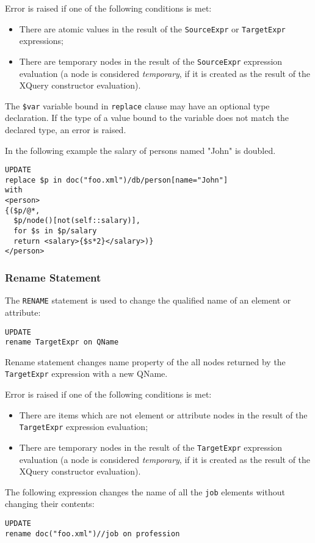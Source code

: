 \documentclass[a4paper,12pt]{article}
\begin{document}
Error is raised if one of the following conditions is met:
\begin{itemize}
\item There are atomic values in the result of the \verb!SourceExpr! or
\verb!TargetExpr! expressions;
\item There are temporary nodes in the result of the \verb!SourceExpr!
expression evaluation (a node is considered \emph{temporary}, if it is created
as the result of the XQuery constructor evaluation).
\end{itemize}

The \verb!$var! variable bound in \verb!replace! clause may have an optional
type declaration. If the type of a value bound to the variable does not match
the declared type, an error is raised.

In the following example the salary of persons named "John" is doubled.

\begin{verbatim}
UPDATE
replace $p in doc("foo.xml")/db/person[name="John"]
with
<person>
{($p/@*,
  $p/node()[not(self::salary)],
  for $s in $p/salary
  return <salary>{$s*2}</salary>)}
</person>
\end{verbatim}


\subsubsection*{Rename Statement}
The \verb!RENAME! statement is used to change the qualified name of an element
or attribute:

\begin{verbatim}
UPDATE
rename TargetExpr on QName
\end{verbatim}
Rename statement changes name property of the all nodes returned by the
\verb!TargetExpr! expression with a new QName.

Error is raised if one of the following conditions is met:
\begin{itemize}
\item There are items which are not element or attribute nodes in the result of
the \verb!TargetExpr! expression evaluation;
\item There are temporary nodes in the result of the \verb!TargetExpr!
expression evaluation (a node is considered \emph{temporary}, if it is created
as the result of the XQuery constructor evaluation).
\end{itemize}

The following expression changes the name of all the \verb!job! elements without
changing their contents:
\begin{verbatim}
UPDATE
rename doc("foo.xml")//job on profession
\end{verbatim}
\end{document}
